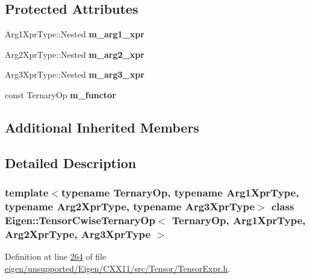 \subsection*{Protected Attributes}
\begin{DoxyCompactItemize}
\item 
\mbox{\label{class_eigen_1_1_tensor_cwise_ternary_op_ad139df8823218db6b62b30c30de61082}} 
Arg1\+Xpr\+Type\+::\+Nested {\bfseries m\+\_\+arg1\+\_\+xpr}
\item 
\mbox{\label{class_eigen_1_1_tensor_cwise_ternary_op_aa1a1599bddcc1e4f1b310040c2844bf5}} 
Arg2\+Xpr\+Type\+::\+Nested {\bfseries m\+\_\+arg2\+\_\+xpr}
\item 
\mbox{\label{class_eigen_1_1_tensor_cwise_ternary_op_a444fc01e31173cb192ac22b9fa52c97b}} 
Arg3\+Xpr\+Type\+::\+Nested {\bfseries m\+\_\+arg3\+\_\+xpr}
\item 
\mbox{\label{class_eigen_1_1_tensor_cwise_ternary_op_ac360f0a5d920835cea7e2d8741101e06}} 
const Ternary\+Op {\bfseries m\+\_\+functor}
\end{DoxyCompactItemize}
\subsection*{Additional Inherited Members}


\subsection{Detailed Description}
\subsubsection*{template$<$typename Ternary\+Op, typename Arg1\+Xpr\+Type, typename Arg2\+Xpr\+Type, typename Arg3\+Xpr\+Type$>$\newline
class Eigen\+::\+Tensor\+Cwise\+Ternary\+Op$<$ Ternary\+Op, Arg1\+Xpr\+Type, Arg2\+Xpr\+Type, Arg3\+Xpr\+Type $>$}



Definition at line \hyperlink{eigen_2unsupported_2_eigen_2_c_x_x11_2src_2_tensor_2_tensor_expr_8h_source_l00264}{264} of file \hyperlink{eigen_2unsupported_2_eigen_2_c_x_x11_2src_2_tensor_2_tensor_expr_8h_source}{eigen/unsupported/\+Eigen/\+C\+X\+X11/src/\+Tensor/\+Tensor\+Expr.\+h}.



